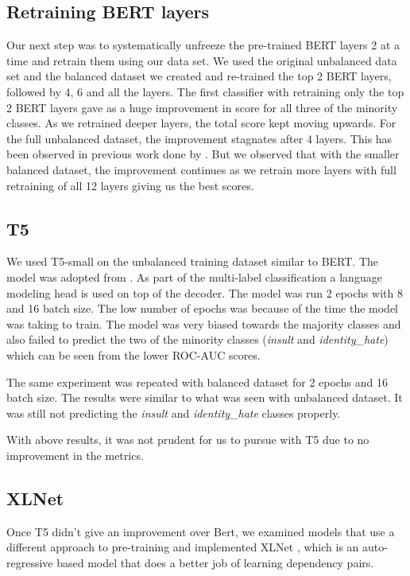 \documentclass[11pt,a4paper]{article}
\begin{document}
\subsection{Retraining BERT layers}
Our next step was to systematically unfreeze the pre-trained BERT layers 2 at a time and retrain them using our data set. We used the original unbalanced data set and the balanced dataset we created and re-trained the top 2 BERT layers, followed by 4, 6 and all the layers.
The first classifier with retraining only the top 2 BERT layers gave as a huge improvement in score for all three of the minority classes. As we retrained deeper layers, the total score kept moving upwards. For the full unbalanced dataset, the improvement stagnates after 4 layers. This has been observed in previous work done by \citet*{Singh2020HowMD}. But we observed that with the smaller balanced dataset, the improvement continues as we retrain more layers with full retraining of all 12 layers giving us the best scores.


\subsection{T5}
We used T5-small \cite{raffel2020exploring} on the unbalanced training dataset similar to BERT. The model was adopted from \citet*{t5mlcode}. As part of the multi-label classification a language modeling head is used on top of the decoder. The model was run 2 epochs with 8 and 16 batch size. The low number of epochs was because of the time the model was taking to train. The model was very biased towards the majority classes and also failed to predict the two of the minority classes (\emph{insult} and \emph{identity\_hate}) which can be seen from the lower ROC-AUC scores.

The same experiment was repeated with balanced dataset for 2 epochs and 16 batch size. The results were similar to what was seen with unbalanced dataset. It was still not predicting the \emph{insult} and \emph{identity\_hate} classes properly.

With above results, it was not prudent for us to pursue with T5 due to no improvement in the metrics.

\subsection{XLNet}

Once T5 didn't give an improvement over Bert, we examined models that use a different approach to pre-training and implemented XLNet \cite{yang2019xlnet}, which is an auto-regressive based model that does a better job of learning dependency pairs.
\end{document}
